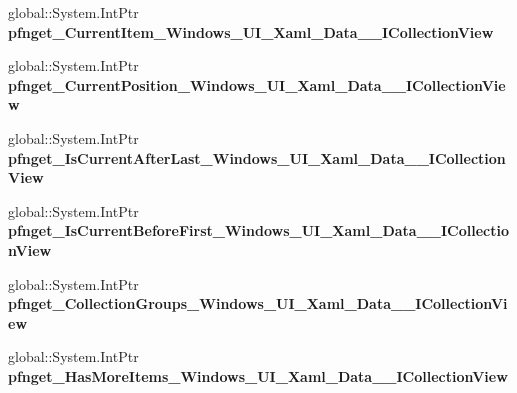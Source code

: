 \begin{DoxyCompactItemize}
global\+::\+System.\+Int\+Ptr {\bfseries pfnget\+\_\+\+Current\+Item\+\_\+\+Windows\+\_\+\+U\+I\+\_\+\+Xaml\+\_\+\+Data\+\_\+\+\_\+\+I\+Collection\+View}
\item 
\mbox{\label{struct_windows_1_1_u_i_1_1_xaml_1_1_data_1_1_i_collection_view_____impl_1_1_vtbl_a52652fe9a21d2ebb6a9a2701f042af5a}} 
global\+::\+System.\+Int\+Ptr {\bfseries pfnget\+\_\+\+Current\+Position\+\_\+\+Windows\+\_\+\+U\+I\+\_\+\+Xaml\+\_\+\+Data\+\_\+\+\_\+\+I\+Collection\+View}
\item 
\mbox{\label{struct_windows_1_1_u_i_1_1_xaml_1_1_data_1_1_i_collection_view_____impl_1_1_vtbl_a623b5437c36b889e7f0b6634ea25266d}} 
global\+::\+System.\+Int\+Ptr {\bfseries pfnget\+\_\+\+Is\+Current\+After\+Last\+\_\+\+Windows\+\_\+\+U\+I\+\_\+\+Xaml\+\_\+\+Data\+\_\+\+\_\+\+I\+Collection\+View}
\item 
\mbox{\label{struct_windows_1_1_u_i_1_1_xaml_1_1_data_1_1_i_collection_view_____impl_1_1_vtbl_ad404dab461baf7ce983151e68f6f8e47}} 
global\+::\+System.\+Int\+Ptr {\bfseries pfnget\+\_\+\+Is\+Current\+Before\+First\+\_\+\+Windows\+\_\+\+U\+I\+\_\+\+Xaml\+\_\+\+Data\+\_\+\+\_\+\+I\+Collection\+View}
\item 
\mbox{\label{struct_windows_1_1_u_i_1_1_xaml_1_1_data_1_1_i_collection_view_____impl_1_1_vtbl_ac3291ee60029a5916d8ca0a1b9dea0a2}} 
global\+::\+System.\+Int\+Ptr {\bfseries pfnget\+\_\+\+Collection\+Groups\+\_\+\+Windows\+\_\+\+U\+I\+\_\+\+Xaml\+\_\+\+Data\+\_\+\+\_\+\+I\+Collection\+View}
\item 
\mbox{\label{struct_windows_1_1_u_i_1_1_xaml_1_1_data_1_1_i_collection_view_____impl_1_1_vtbl_a50aed0c54148b565116ac8b5b889245b}} 
global\+::\+System.\+Int\+Ptr {\bfseries pfnget\+\_\+\+Has\+More\+Items\+\_\+\+Windows\+\_\+\+U\+I\+\_\+\+Xaml\+\_\+\+Data\+\_\+\+\_\+\+I\+Collection\+View}
\item 
\mbox{\label{struct_windows_1_1_u_i_1_1_xaml_1_1_data_1_1_i_collection_view_____impl_1_1_vtbl_a04b0279a628b41a81c6e296b39d69484}} 

\end{DoxyCompactItemize}
